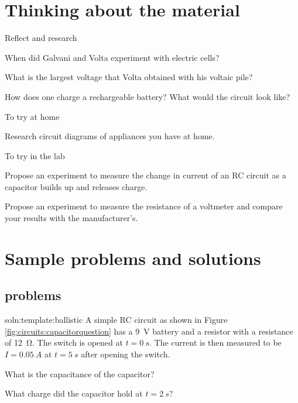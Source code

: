 \newpage
\section{Thinking about the material}

\begin{chapteractivity}{Reflect and research}
{
\item When did Galvani and Volta experiment with electric cells?
\item What is the largest voltage that Volta obtained with his voltaic pile?
\item How does one charge a rechargeable battery? What would the circuit look like?
}
\end{chapteractivity}

\begin{chapteractivity}{To try at home}
{
\item Research circuit diagrams of appliances you have at home.
}
\end{chapteractivity}

\begin{chapteractivity}{To try in the lab}
{
\item Propose an experiment to measure the change in current of an RC circuit as a capacitor builds up and releases charge.
\item Propose an experiment to measure the resistance of a voltmeter and compare your results with the manufacturer's.
}
\end{chapteractivity}

\newpage
\section{Sample problems and solutions}

\subsection{problems}
\begin{problemParts}{soln:template:ballistic}{\label{prob:template:ballistic} 
A simple RC circuit as shown in Figure \ref{fig:circuits:capacitorquestion} has a \SI{9}{V} battery and a resistor with a resistance of \SI{12}{\ohm}. The switch is opened at $t = \SI{0}{s}$. The current is then measured to be $I = \SI{0.05}{A}$ at $t = \SI{5}{s}$ after opening the switch.}{
	\item What is the capacitance of the capacitor?
	\item What charge did the capacitor hold at $t = \SI{2}{s}$?
	}


\end{problemParts}

